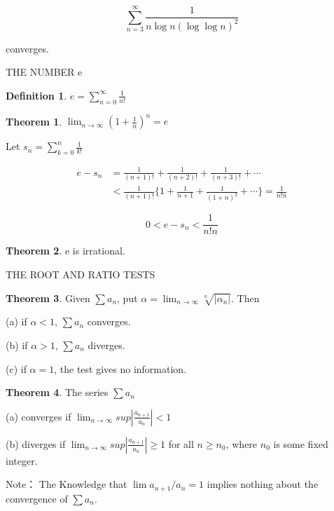\documentclass{article}
\theoremstyle{definition}
\newtheorem{defi}{Definition}
\newtheorem{theo}{Theorem}
\theoremstyle{remark}
\begin{document}
\[
\sum^\infty_{n=3}\frac{1}{n\log{n}(\log{\log{n}})^2}
\]

converges.


\newpage

THE NUMBER e

\begin{defi}
$e=\sum^\infty_{n=0}\frac{1}{n!}$	
\end{defi}

\begin{theo}
	$\lim_{n\rightarrow\infty}(1+\frac{1}{n})^n=e$
\end{theo}

\noindent Let $s_n=\sum^n_{k=0}\frac{1}{k!}$

\begin{equation*}
	\begin{split}
		e-s_n&=\frac{1}{(n+1)!}+\frac{1}{(n+2)!}+\frac{1}{(n+3)!}+\cdots\\
			 &<\frac{1}{(n+1)!}\{1+\frac{1}{n+1}+\frac{1}{(1+n)^2}+\cdots\}=\frac{1}{n!n}
	\end{split}
\end{equation*}

\[
0<e-s_n<\frac{1}{n!n}
\]

\begin{theo}
	e is irrational.
\end{theo}

\newpage

THE ROOT AND RATIO TESTS

\begin{theo}
Given $\sum a_n$, put $\alpha=\lim_{n\rightarrow\infty}\sqrt[n]{|\alpha_n|}$. Then

(a) if $\alpha<1$, $\sum a_n$ converges.

(b) if $\alpha>1$, $\sum a_n$ diverges.

(c) if $\alpha=1$, the test gives no information.
	
\end{theo}

\begin{theo}
	The series $\sum a_n$
	
	(a) converges if $\lim_{n\rightarrow\infty} sup|\frac{a_{n+1}}{a_n}|<1$
	
	(b) diverges if $\lim_{n\rightarrow\infty} sup|\frac{a_{n+1}}{a_n}|\ge1$ for all $n\ge n_0$, where $n_0$ is some fixed integer.
	
\end{theo}
Note： The Knowledge that $\lim a_{n+1}/a_n=1$ implies nothing about the convergence of $\sum a_n$. 
\end{document}
